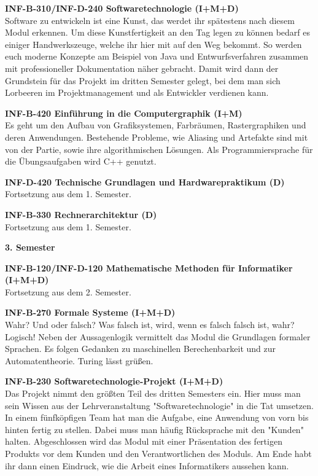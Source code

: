 \textbf{INF-B-310/INF-D-240 Softwaretechnologie (I+M+D)} \\
Software zu entwickeln ist eine Kunst, das werdet ihr spätestens nach diesem Modul erkennen.
Um diese Kunstfertigkeit an den Tag legen zu können bedarf es einiger Handwerkszeuge, welche ihr hier mit auf den Weg bekommt.
So werden euch moderne Konzepte am Beispiel von Java und Entwurfsverfahren zusammen mit professioneller Dokumentation näher gebracht.
Damit wird dann der Grundstein für das Projekt im dritten Semester gelegt, bei dem man sich Lorbeeren im Projektmanagement und als Entwickler verdienen kann.

\textbf{INF-B-420 Einführung in die Computergraphik (I+M)} \\
Es geht um den Aufbau von Grafiksystemen, Farbräumen, Rastergraphiken und deren Anwendungen.
Bestehende Probleme, wie Aliasing und Artefakte sind mit von der Partie, sowie ihre algorithmischen Lösungen.
Als Programmiersprache für die Übungsaufgaben wird C++ genutzt.

\textbf{INF-D-420 Technische Grundlagen und Hardwarepraktikum (D)} \\
Fortsetzung aus dem 1. Semester.

\textbf{INF-B-330 Rechnerarchitektur (D)} \\
Fortsetzung aus dem 1. Semester.

\textbf{3. Semester}

\textbf{INF-B-120/INF-D-120 Mathematische Methoden für Informatiker (I+M+D)} \\
Fortsetzung aus dem 2. Semester.

\textbf{INF-B-270 Formale Systeme (I+M+D)} \\
Wahr?
Und oder falsch?
Was falsch ist, wird, wenn es falsch falsch ist, wahr?
Logisch!
Neben der Aussagenlogik vermittelt das Modul die Grundlagen formaler Sprachen.
Es folgen Gedanken zu maschinellen Berechenbarkeit und zur Automatentheorie.
Turing lässt grüßen.

\textbf{INF-B-230 Softwaretechnologie-Projekt (I+M+D)} \\
Das Projekt nimmt den größten Teil des dritten Semesters ein.
Hier muss man sein Wissen aus der Lehrveranstaltung "Softwaretechnologie" in die Tat umsetzen.
In einem fünfköpfigen Team hat man die Aufgabe, eine Anwendung von vorn bis hinten fertig zu stellen.
Dabei muss man häufig Rücksprache mit den "Kunden" halten.
Abgeschlossen wird das Modul mit einer Präsentation des fertigen Produkts vor dem Kunden und den Verantwortlichen des Moduls.
Am Ende habt ihr dann einen Eindruck, wie die Arbeit eines Informatikers aussehen kann.

